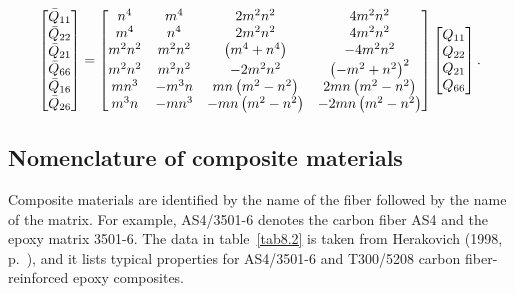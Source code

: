 \documentclass{AeroStructure-ERJohnson}
\begin{document}
\begin{align}\label{eq8.31}
\left[\begin{array}{@{}l@{}} \bar{Q}_{11}\\
\bar{Q}_{22}\\
\bar{Q}_{21}\\
\bar{Q}_{66}\\
\bar{Q}_{16}\\
\bar{Q}_{26}
\end{array}\right]=\left[\begin{array}{@{}cccc@{}} n^{4} & m^{4} &
2 m^{2} n^{2} & 4 m^{2} n^{2}\\
m^{4} & n^{4} & 2 m^{2} n^{2} & 4
m^{2} n^{2}\\
m^{2} n^{2} & m^{2} n^{2} &
\left(m^{4}+n^{4}\right) & -4 m^{2} n^{2}\\
m^{2} n^{2} & m^{2}
n^{2} & -2 m^{2} n^{2} & \left(-m^{2}+n^{2}\right)^{2}\\
m n^{3}
& -m^{3} n & m n\left(m^{2}-n^{2}\right) & 2 m
n\left(m^{2}-n^{2}\right)\\
m^{3} n & -m n^{3} & -m
n\left(m^{2}-n^{2}\right) & -2 m n\left(m^{2}-n^{2}\right)
\end{array}\right]\left[\begin{array}{@{}l@{}} Q_{11}\\
Q_{22}\\
Q_{21}\\
Q_{66} \end{array}\right].
\end{align}

\subsection{Nomenclature of composite materials}\label{sec8.1.4}



Composite materials are identified by the name of the fiber
followed by the name of the matrix. For example, AS4/3501-6
denotes the carbon fiber AS4 and the epoxy matrix 3501-6. The data
in table~\ref{tab8.2} is taken from Herakovich (1998, p.~\pageref{Herakovich}), and it lists
typical properties for AS4/3501-6 and T300/5208 carbon
fiber-reinforced epoxy composites.
\end{document}
